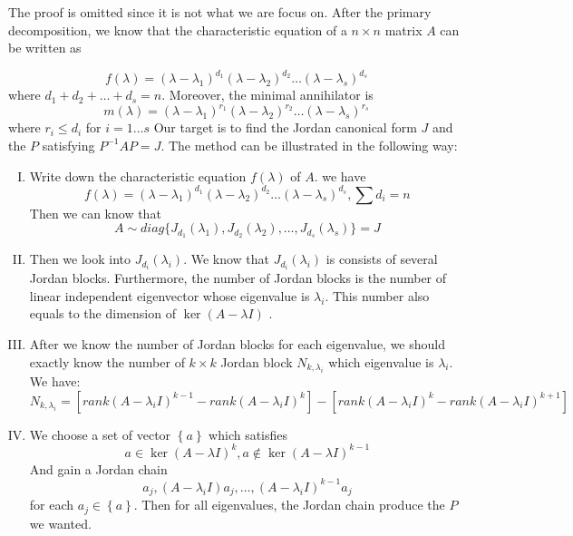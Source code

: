 \documentclass[a4paper]{article}
\newenvironment{enumerateromancap}{\begin{enumerate}[I.] }{\end{enumerate}}
\begin{document}
The proof is omitted since it is not what we are focus on.
After the primary decomposition, we know that the characteristic equation of a $n\times n$ matrix $A$ can be written as

\begin{equation}
f(\lambda )={{(\lambda -{{\lambda }_{1}})}^{{{d}_{1}}}}{{(\lambda -{{\lambda }_{2}})}^{{{d}_{2}}}}\ldots {{(\lambda -{{\lambda }_{s}})}^{{{d}_{s}}}}
\end{equation}
where ${{d}_{1}}+{{d}_{2}}+\ldots +{{d}_{s}}=n$. Moreover, the minimal annihilator is
\begin{equation}
m(\lambda )={{(\lambda -{{\lambda }_{1}})}^{{{r}_{1}}}}{{(\lambda -{{\lambda }_{2}})}^{{{r}_{2}}}}\ldots {{(\lambda -{{\lambda }_{s}})}^{{{r}_{s}}}}
\end{equation}
where ${{r}_{i}}\le {{d}_{i}}$ for $i=1\ldots s$
Our target is to find the Jordan canonical form $J$ and the $P$ satisfying ${{P}^{-1}}AP=J$. The method can be illustrated in the following way:


\begin{enumerateromancap}
  \item Write down the characteristic equation $f(\lambda )$ of $A$. we have
  \[f(\lambda )={{(\lambda -{{\lambda }_{1}})}^{{{d}_{1}}}}{{(\lambda -{{\lambda }_{2}})}^{{{d}_{2}}}}\ldots {{(\lambda -{{\lambda }_{s}})}^{{{d}_{s}}}},\sum{{{d}_{i}}}=n\]
   Then we can know that
   \[A\sim diag\{{{J}_{{{d}_{1}}}}({{\lambda }_{1}}),{{J}_{{{d}_{2}}}}({{\lambda }_{2}}),\ldots ,{{J}_{{{d}_{s}}}}({{\lambda }_{s}})\}=J\]
  \item Then we look into ${{J}_{{{d}_{i}}}}({{\lambda }_{i}})$. We know that ${{J}_{{{d}_{i}}}}({{\lambda }_{i}})$ is consists of several Jordan blocks. Furthermore, the number of Jordan blocks is the number of linear independent eigenvector whose eigenvalue is ${{\lambda }_{i}}$. This number also equals to the dimension of $\ker (A-\lambda I)$ .
  \item After we know the number of Jordan blocks for each eigenvalue, we should exactly know the number of $k\times k$ Jordan block ${{N}_{k,{{\lambda }_{i}}}}$  which eigenvalue is ${{\lambda }_{i}}$. We have:
      \[{{N}_{k,{{\lambda }_{i}}}}=[rank{{(A-{{\lambda }_{i}}I)}^{k-1}}-rank{{(A-{{\lambda }_{i}}I)}^{k}}]-[rank{{(A-{{\lambda }_{i}}I)}^{k}}-rank{{(A-{{\lambda }_{i}}I)}^{k+1}}]\]
    \item We choose a set of vector $\left\{ a \right\}$ which satisfies
    \[a\in \ker {{(A-\lambda I)}^{k}},a\notin \ker {{(A-\lambda I)}^{k-1}}\]
And gain a Jordan chain
\[{{a}_{j}},(A-{{\lambda }_{i}}I){{a}_{j}},\ldots ,{{(A-{{\lambda }_{i}}I)}^{k-1}}{{a}_{j}}\]
 for each ${{a}_{j}}\in \left\{ a \right\}$. Then for all eigenvalues, the Jordan chain produce the $P$ we wanted.
\end{enumerateromancap}
\end{document}
